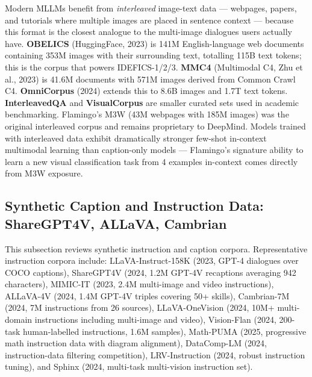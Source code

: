 Modern MLLMs benefit from \emph{interleaved} image-text data --- webpages, papers, and tutorials where multiple images are placed in sentence context --- because this format is the closest analogue to the multi-image dialogues users actually have. \textbf{OBELICS} (HuggingFace, 2023) is 141M English-language web documents containing 353M images with their surrounding text, totalling 115B text tokens; this is the corpus that powers IDEFICS-1/2/3. \textbf{MMC4} (Multimodal C4, Zhu et al., 2023) is 41.6M documents with 571M images derived from Common Crawl C4. \textbf{OmniCorpus} (2024) extends this to 8.6B images and 1.7T text tokens. \textbf{InterleavedQA} and \textbf{VisualCorpus} are smaller curated sets used in academic benchmarking. Flamingo's M3W (43M webpages with 185M images) was the original interleaved corpus and remains proprietary to DeepMind. Models trained with interleaved data exhibit dramatically stronger few-shot in-context multimodal learning than caption-only models --- Flamingo's signature ability to learn a new visual classification task from 4 examples in-context comes directly from M3W exposure.

\subsection{Synthetic Caption and Instruction Data: ShareGPT4V, ALLaVA, Cambrian}\label{synthetic-caption-and-instruction-data-sharegpt4v-allava-cambrian}

This subsection reviews synthetic instruction and caption corpora. Representative instruction corpora include: LLaVA-Instruct-158K (2023, GPT-4 dialogues over COCO captions), ShareGPT4V (2024, 1.2M GPT-4V recaptions averaging 942 characters), MIMIC-IT (2023, 2.4M multi-image and video instructions), ALLaVA-4V (2024, 1.4M GPT-4V triples covering 50+ skills), Cambrian-7M (2024, 7M instructions from 26 sources), LLaVA-OneVision (2024, 10M+ multi-domain instructions including multi-image and video), Vision-Flan (2024, 200-task human-labelled instructions, 1.6M samples), Math-PUMA (2025, progressive math instruction data with diagram alignment), DataComp-LM (2024, instruction-data filtering competition), LRV-Instruction (2024, robust instruction tuning), and Sphinx (2024, multi-task multi-vision instruction set).

